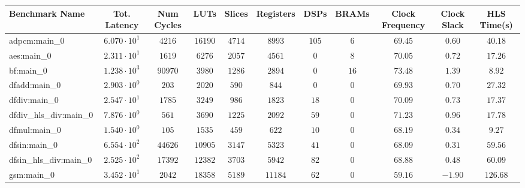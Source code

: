 \begin{tabular}{|l|c|c|c|c|c|c|c|c|c|c|}
\hline
Benchmark Name          & Tot. Latency           & Num Cycles & LUTs       & Slices    & Registers & DSPs    & BRAMs  & Clock Frequency & Clock Slack & HLS Time(s) \\
\hline
adpcm:main\_0           & $ 6.070 \cdot 10^{1} $ & $ 4216   $ & $ 16190  $ & $ 4714  $ & $ 8993  $ & $ 105 $ & $ 6  $ & $ 69.45       $ & $ 0.60    $ & $ 40.18   $ \\
aes:main\_0             & $ 2.311 \cdot 10^{1} $ & $ 1619   $ & $ 6276   $ & $ 2057  $ & $ 4561  $ & $ 0   $ & $ 8  $ & $ 70.05       $ & $ 0.72    $ & $ 17.26   $ \\
bf:main\_0              & $ 1.238 \cdot 10^{3} $ & $ 90970  $ & $ 3980   $ & $ 1286  $ & $ 2894  $ & $ 0   $ & $ 16 $ & $ 73.48       $ & $ 1.39    $ & $ 8.92    $ \\
dfadd:main\_0           & $ 2.903 \cdot 10^{0} $ & $ 203    $ & $ 2020   $ & $ 590   $ & $ 844   $ & $ 0   $ & $ 0  $ & $ 69.93       $ & $ 0.70    $ & $ 27.32   $ \\
dfdiv:main\_0           & $ 2.547 \cdot 10^{1} $ & $ 1785   $ & $ 3249   $ & $ 986   $ & $ 1823  $ & $ 18  $ & $ 0  $ & $ 70.09       $ & $ 0.73    $ & $ 17.37   $ \\
dfdiv\_hls\_div:main\_0 & $ 7.876 \cdot 10^{0} $ & $ 561    $ & $ 3690   $ & $ 1225  $ & $ 2092  $ & $ 59  $ & $ 0  $ & $ 71.23       $ & $ 0.96    $ & $ 17.78   $ \\
dfmul:main\_0           & $ 1.540 \cdot 10^{0} $ & $ 105    $ & $ 1535   $ & $ 459   $ & $ 622   $ & $ 10  $ & $ 0  $ & $ 68.19       $ & $ 0.34    $ & $ 9.27    $ \\
dfsin:main\_0           & $ 6.554 \cdot 10^{2} $ & $ 44626  $ & $ 10905  $ & $ 3147  $ & $ 5323  $ & $ 41  $ & $ 0  $ & $ 68.09       $ & $ 0.31    $ & $ 59.56   $ \\
dfsin\_hls\_div:main\_0 & $ 2.525 \cdot 10^{2} $ & $ 17392  $ & $ 12382  $ & $ 3703  $ & $ 5942  $ & $ 82  $ & $ 0  $ & $ 68.88       $ & $ 0.48    $ & $ 60.09   $ \\
gsm:main\_0             & $ 3.452 \cdot 10^{1} $ & $ 2042   $ & $ 18358  $ & $ 5189  $ & $ 11184 $ & $ 62  $ & $ 0  $ & $ 59.16       $ & $ -1.90   $ & $ 126.68  $ \\

\end{tabular}
